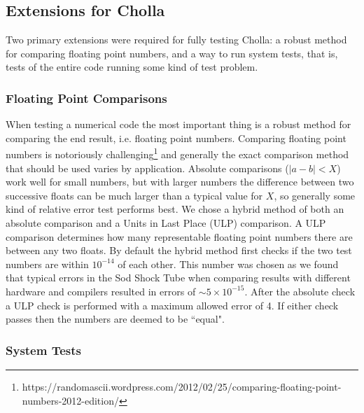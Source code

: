 \subsection{Extensions for Cholla}

Two primary extensions were required for fully testing Cholla: a robust method for comparing floating point numbers, and a way to run system tests, that is, tests of the entire code running some kind of test problem.

\subsubsection{Floating Point Comparisons}
\label{sec:fp-comparing}

When testing a numerical code the most important thing is a robust method for comparing the end result, i.e. floating point numbers. Comparing floating point numbers is notoriously challenging\footnote{https://randomascii.wordpress.com/2012/02/25/comparing-floating-point-numbers-2012-edition/} and generally the exact comparison method that should be used varies by application. Absolute comparisons ($|a-b| < X$) work well for small numbers, but with larger numbers the difference between two successive floats can be much larger than a typical value for $X$, so generally some kind of relative error test performs best. We chose a hybrid method of both an absolute comparison and a Units in Last Place (ULP) comparison. A ULP comparison determines how many representable floating point numbers there are between any two floats. By default the hybrid method first checks if the two test numbers are within $10^{-14}$ of each other. This number was chosen as we found that typical errors in the Sod Shock Tube when comparing results with different hardware and compilers resulted in errors of $\sim5\times10^{-15}$. After the absolute check a ULP check is performed with a maximum allowed error of 4. If either check passes then the numbers are deemed to be ``equal".

\subsubsection{System Tests}

